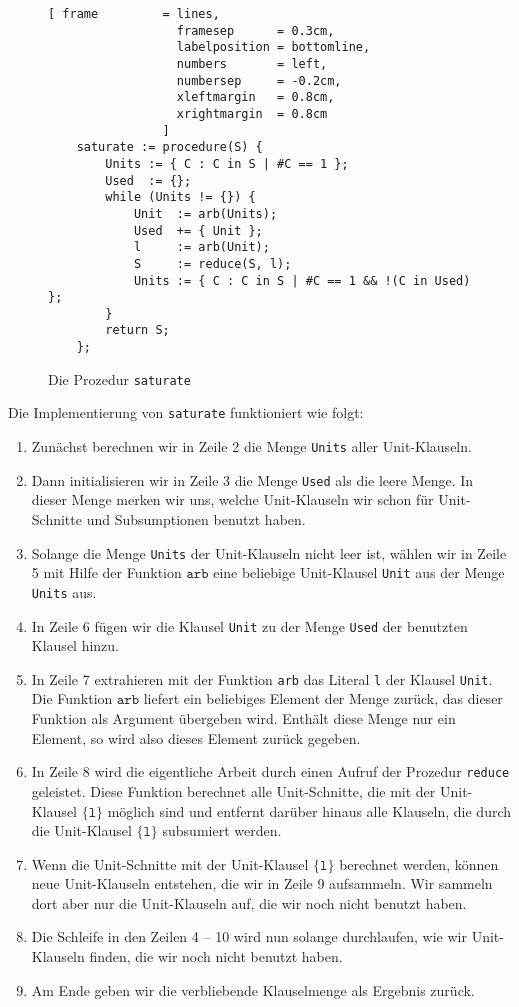\begin{figure}[!ht]
  \centering
\begin{Verbatim}[ frame         = lines, 
                  framesep      = 0.3cm, 
                  labelposition = bottomline,
                  numbers       = left,
                  numbersep     = -0.2cm,
                  xleftmargin   = 0.8cm,
                  xrightmargin  = 0.8cm
                ]
    saturate := procedure(S) {
        Units := { C : C in S | #C == 1 };
        Used  := {};
        while (Units != {}) {
            Unit  := arb(Units);
            Used  += { Unit };
            l     := arb(Unit);
            S     := reduce(S, l);
            Units := { C : C in S | #C == 1 && !(C in Used) };        
        }
        return S;
    };
\end{Verbatim}
\vspace*{-0.3cm}
  \caption{Die Prozedur \texttt{saturate}}
  \label{fig:saturate}
\end{figure} 
Die Implementierung von \texttt{saturate} funktioniert wie folgt: 
\begin{enumerate}
\item Zunächst berechnen wir in Zeile 2 die Menge \texttt{Units} aller Unit-Klauseln.  
\item Dann initialisieren wir in Zeile 3 die Menge \texttt{Used} als die leere Menge.
      In dieser Menge merken wir uns, welche Unit-Klauseln wir schon für Unit-Schnitte und
      Subsumptionen benutzt haben.
\item Solange die Menge \texttt{Units} der Unit-Klauseln nicht leer ist, wählen wir in Zeile 5
      mit Hilfe der Funktion $\texttt{arb}$ eine beliebige Unit-Klausel \texttt{Unit} aus der Menge
      \texttt{Units} aus. 
\item In Zeile 6 fügen wir die Klausel \texttt{Unit} zu der Menge
      \texttt{Used} der benutzten Klausel hinzu.  
\item In Zeile 7 extrahieren mit der Funktion \texttt{arb} das Literal \texttt{l} der Klausel
      \texttt{Unit}.  Die Funktion $\texttt{arb}$ liefert ein beliebiges Element der Menge zurück,
      das dieser Funktion als Argument übergeben wird.  Enthält diese Menge nur ein Element, so
      wird also dieses Element zurück gegeben.
\item In Zeile 8 wird  die eigentliche Arbeit durch einen Aufruf der Prozedur
      \texttt{reduce} geleistet.  Diese Funktion berechnet alle Unit-Schnitte, die mit der
      Unit-Klausel $\{\texttt{l}\}$ möglich sind und entfernt darüber hinaus alle Klauseln, die
      durch die Unit-Klausel $\{\texttt{l}\}$ subsumiert werden.
\item Wenn die Unit-Schnitte mit der Unit-Klausel $\{\texttt{l}\}$ berechnet werden, können neue
      Unit-Klauseln entstehen, die wir in Zeile 9 aufsammeln.  Wir sammeln dort aber nur die Unit-Klauseln auf,
       die wir noch nicht benutzt haben. 
\item Die Schleife in den Zeilen 4 -- 10 wird nun solange durchlaufen, wie wir 
      Unit-Klauseln finden, die wir noch nicht benutzt haben.
\item Am Ende geben wir die verbliebende Klauselmenge als Ergebnis zurück.
\end{enumerate}
